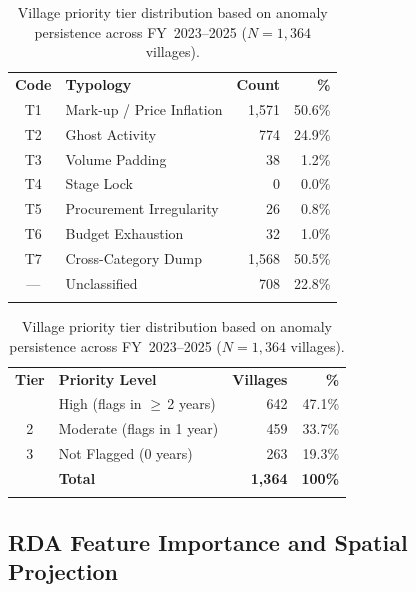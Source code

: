 \documentclass[3p,times,procedia]{elsarticle}
\begin{document}
\begin{table}[htb]
\begin{minipage}[t]{0.53\textwidth}
\caption{Corruption typology frequencies (multi-label; $n = 3{,}107$ consensus-flagged records).}
\label{tab:typology}
\begin{tabular*}{\linewidth}{@{\extracolsep{\fill}}clrr@{}}
\toprule
\textbf{Code} & \textbf{Typology} & \textbf{Count} & \textbf{\%} \\
\colrule
T1  & Mark-up / Price Inflation  & 1,571 & 50.6\% \\
T2  & Ghost Activity             &   774 & 24.9\% \\
T3  & Volume Padding             &    38 &  1.2\% \\
T4  & Stage Lock                 &     0 &  0.0\% \\
T5  & Procurement Irregularity   &    26 &  0.8\% \\
T6  & Budget Exhaustion          &    32 &  1.0\% \\
T7  & Cross-Category Dump        & 1,568 & 50.5\% \\
--- & Unclassified               &   708 & 22.8\% \\
\botrule
\end{tabular*}
\end{minipage}\hfill
\begin{minipage}[t]{0.43\textwidth}
\caption{Village priority tier distribution based on anomaly persistence across FY~2023--2025 ($N = 1{,}364$ villages).}
\label{tab:village_tiers}
\begin{tabular*}{\linewidth}{@{\extracolsep{\fill}}clrr@{}}
\toprule
\textbf{Tier} & \textbf{Priority Level} & \textbf{Villages} & \textbf{\%} \\
\colrule
1 & High (flags in $\geq$\,2 years) & 642 & 47.1\% \\
2 & Moderate (flags in 1 year)      & 459 & 33.7\% \\
3 & Not Flagged (0 years)           & 263 & 19.3\% \\
\colrule
  & \textbf{Total}                  & \textbf{1,364} & \textbf{100\%} \\
\botrule
\end{tabular*}
\end{minipage}
\end{table}

\subsection{RDA Feature Importance and Spatial Projection}
\end{document}
